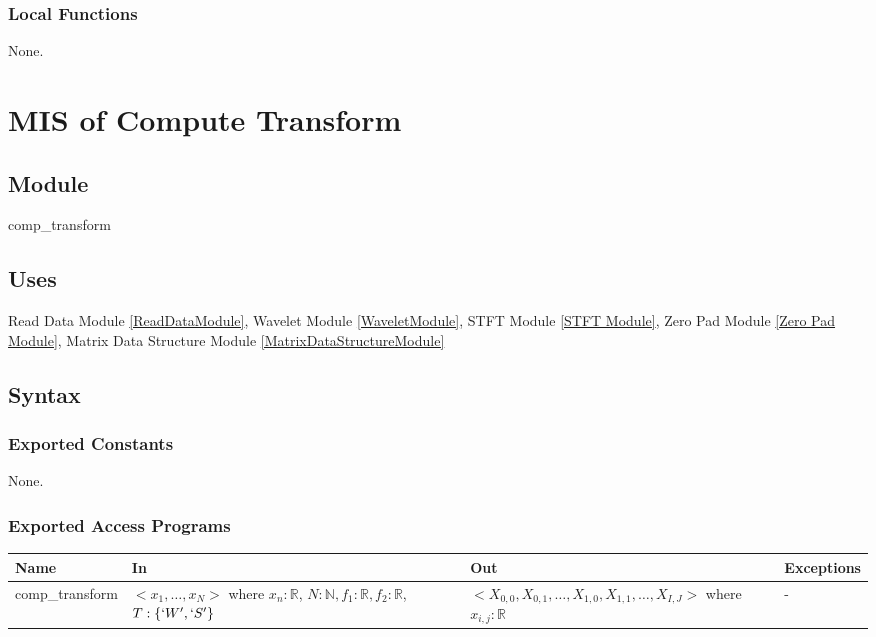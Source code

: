 \documentclass[12pt, titlepage]{article}
\begin{document}

\subsubsection{Local Functions}
None.
 
  \newpage
\section{MIS of Compute Transform} \label{CompTransformModule} 



\subsection{Module}
comp\_transform

\subsection{Uses}
Read Data Module \ref{ReadDataModule}, Wavelet Module \ref{WaveletModule}, STFT Module \ref{STFT Module}, Zero Pad Module \ref{Zero Pad Module}, Matrix Data Structure Module \ref{MatrixDataStructureModule}
\subsection{Syntax}

\subsubsection{Exported Constants}
None.
\subsubsection{Exported Access Programs}

\begin{center}
\begin{tabular}{p{3cm} p{4cm} p{5cm} p{1cm}}
\hline
\textbf{Name} & \textbf{In} & \textbf{Out} & \textbf{Exceptions} \\
\hline
comp\_transform & $<x_1,\dots,x_N>$ where $ x_n:\mathbb{R}$, $N:\mathbb{N}, f_1:
\mathbb{R}, f_2 : \mathbb{R}$, $T: \{`W',`S'\}$ & $<X_{0,0},X_{0,1},\dots, X_{1,0},X_{1,1},\dots, X_{I,J}>$ where $ x_{i,j}:\mathbb{R}$ & - \\
\hline
\end{tabular}
\end{center}
\end{document}
